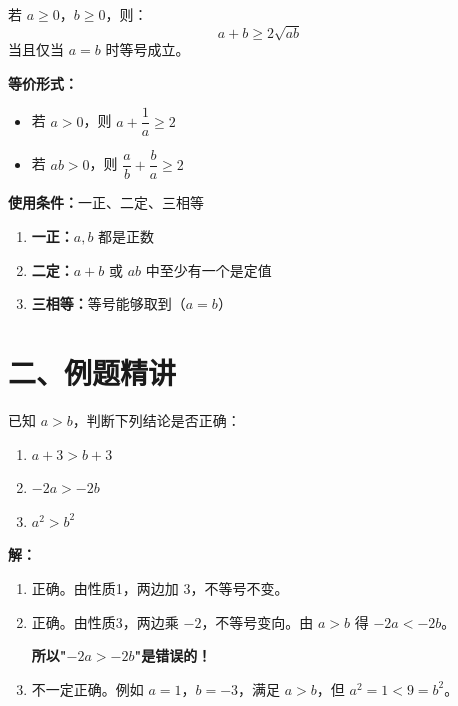 \documentclass[12pt, a4paper]{ctexart}
\begin{document}
\begin{knowledgebox}
若 $a \geq 0$，$b \geq 0$，则：
\[
\boxed{a + b \geq 2\sqrt{ab}}
\]
当且仅当 $a = b$ 时等号成立。

\medskip
\textbf{等价形式：}
\begin{itemize}
  \item 若 $a > 0$，则 $a + \dfrac{1}{a} \geq 2$
  \item 若 $ab > 0$，则 $\dfrac{a}{b} + \dfrac{b}{a} \geq 2$
\end{itemize}

\textbf{使用条件：}一正、二定、三相等
\begin{enumerate}[label=(\arabic*)]
  \item \textbf{一正：}$a, b$ 都是正数
  \item \textbf{二定：}$a + b$ 或 $ab$ 中至少有一个是定值
  \item \textbf{三相等：}等号能够取到（$a = b$）
\end{enumerate}
\end{knowledgebox}


\section*{\textcolor{examorange}{二、例题精讲}}

\begin{examplebox}[【例题1】不等式基本性质的运用]
已知 $a > b$，判断下列结论是否正确：
\begin{enumerate}[label=(\arabic*)]
  \item $a + 3 > b + 3$
  \item $-2a > -2b$
  \item $a^2 > b^2$
\end{enumerate}
\end{examplebox}

\textbf{解：}
\begin{enumerate}[label=(\arabic*)]
  \item 正确。由性质1，两边加 $3$，不等号不变。
  \item 正确。由性质3，两边乘 $-2$，不等号变向。由 $a > b$ 得 $-2a < -2b$。

  \textbf{所以"$-2a > -2b$"是错误的！}

  \item 不一定正确。例如 $a = 1$，$b = -3$，满足 $a > b$，但 $a^2 = 1 < 9 = b^2$。
\end{enumerate}
\end{document}
